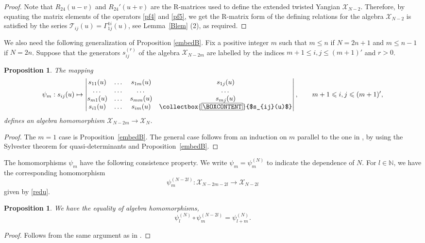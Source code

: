 \documentclass[11pt,reqno]{amsart}
\newcommand{\mybox}{%
    \collectbox{%
        \setlength{\fboxsep}{1pt}%
        \fbox{\BOXCONTENT}%
    }%
}
\numberwithin{equation}{section}
\newtheorem{prop}[thm]{Proposition}
\theoremstyle{definition}
\theoremstyle{remark}
\newcommand{\beq}{\begin{equation}}
\newcommand{\eeq}{\end{equation}}
\newcommand{\bN}{\mathbb{N}}
\newcommand{\scrX}{{\mathscr{X}}}
\begin{document}
\begin{proof}
Note that $R_{24}(u-v)$ and $R_{24}'(u+v)$ are the R-matrices used to define the extended twisted Yangian $\scrX_{N-2}$. Therefore, by equating the matrix elements of the operators \eqref{pf4} and \eqref{pf5}, we get the R-matrix form of the defining relations for the algebra $\scrX_{N-2}$ is satisfied by the series $\mathcal T_{ij}(u)=\Gamma_{1j}^{1i}(u)$, see Lemma~\ref{Blem} (2), as required.
\end{proof}

We also need the following generalization of Proposition \ref{embedB}. Fix a positive integer $m$ such that
$m\leqslant n$ if $N=2n+1$ and $m\leqslant n-1$ if $N=2n$.
Suppose that the generators $s_{ij}^{(r)}$ of the algebra $\scrX_{N-2m}$ are
labelled by the indices
$m+1\leqslant i,j\leqslant (m+1)'$ and $r>0$.

\begin{prop}\label{prop:red}
The mapping
\beq\label{redu}
\psi_m:s_{ij}(u)\mapsto \left|\begin{matrix}
s_{11}(u)&\dots&s_{1m}(u)&s_{1j}(u)\\
\dots&\dots&\dots&\dots\\
s_{m1}(u)&\dots&s_{mm}(u)&s_{mj}(u)\\
s_{i1}(u)&\dots&s_{im}(u)&\mybox{$s_{ij}(u)$}
\end{matrix}\right|,\qquad m+1\leqslant i,j\leqslant (m+1)',
\eeq
defines an algebra homomorphism $\scrX_{N-2m}\to \scrX_{N}$.
\end{prop}
\begin{proof}
The $m=1$ case is Proposition~\ref{embedB}. The general case follows from an induction on $m$ parallel to the one in \cite[Proof of Prop. 3.7]{JLM18}, by using the Sylvester theorem for quasi-determinants and Proposition~\ref{embedB}.
\end{proof}

The homomorphisms $\psi_m$ have the following consistence property. We write $\psi_m=\psi_m^{(N)}$ to indicate the dependence of $N$. For $l\in\bN$, we have the corresponding homomorphism
\[
\psi_m^{(N-2l)}:\scrX_{N-2m-2l}\to \scrX_{N-2l}
\]
given by \eqref{redu}.

\begin{prop}\label{cons}
We have the equality of algebra homomorphisms,
\[
\psi_l^{(N)}\circ \psi_{m}^{(N-2l)}=\psi_{l+m}^{(N)}.
\]
\end{prop}
\begin{proof}
Follows from the same argument as in \cite[Prop. 3.8]{JLM18}.
\end{proof}
\end{document}
